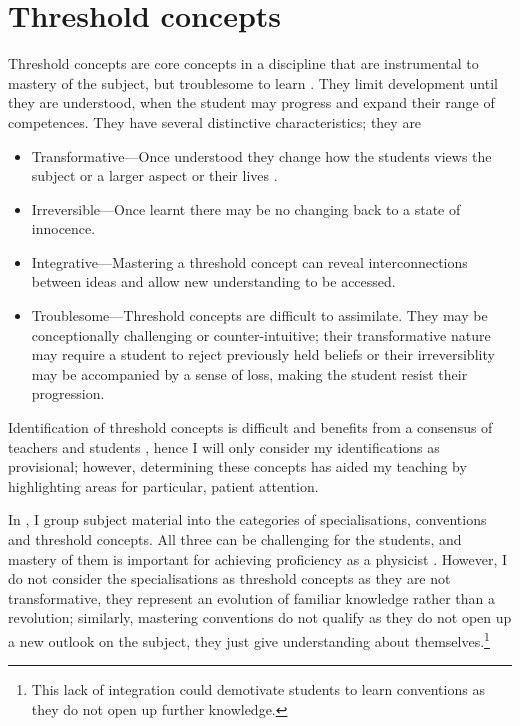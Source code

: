 \chapter{Threshold concepts}\label{ap:threshold}

Threshold concepts are core concepts in a discipline that are instrumental to mastery of the subject, but troublesome to learn \citep{Meyer2003,Meyer2005}. They limit development until they are understood, when the student may progress and expand their range of competences. They have several distinctive characteristics; they are \citep{Mathieson2015}
\begin{itemize}
\item Transformative---Once understood they change how the students views the subject or a larger aspect or their lives \citep[cf.][chapter 2]{Kolb1984}.
\item Irreversible---Once learnt there may be no changing back to a state of innocence.
\item Integrative---Mastering a threshold concept can reveal interconnections between ideas and allow new understanding to be accessed.
\item Troublesome---Threshold concepts are difficult to assimilate. They may be conceptionally challenging or counter-intuitive; their transformative nature may require a student to reject previously held beliefs or their irreversiblity may be accompanied by a sense of loss, making the student resist their progression.
\end{itemize}
Identification of threshold concepts is difficult and benefits from a consensus of teachers and students \citep{Barradell2013}, hence I will only consider my identifications as provisional; however, determining these concepts has aided my teaching by highlighting areas for particular, patient attention.

In , I group subject material into the categories of specialisations, conventions and threshold concepts. All three can be challenging for the students, and mastery of them is important for achieving proficiency as a physicist \citep[cf.][]{Gonsalves2014a}. However, I do not consider the specialisations as threshold concepts as they are not transformative, they represent an evolution of familiar knowledge rather than a revolution; similarly, mastering conventions do not qualify as they do not open up a new outlook on the subject, they just give understanding about themselves.\footnote{This lack of integration could demotivate students to learn conventions as they do not open up further knowledge.}

